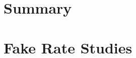 \documentclass{cmspaper}
\begin{document}
\section{Summary}
    \label{sec:summary}


\clearpage
\appendix
\appendixpage
  \section{Fake Rate Studies}
     \label{app:fake_rate_studies}
     
     
\end{document}
